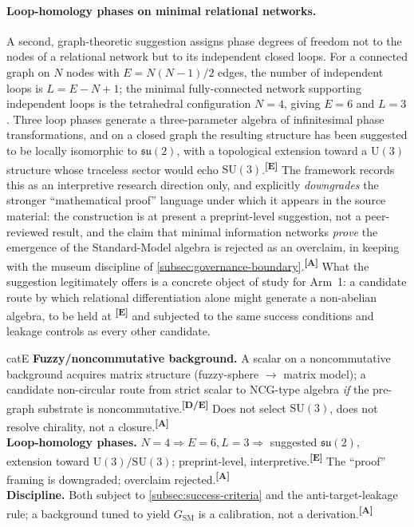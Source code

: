 \documentclass[12pt,a4paper,twoside]{article}
\theoremstyle{plain}
\theoremstyle{definition}
\theoremstyle{remark}
\newcommand{\catmark}[1]{\textsuperscript{\textsf{\textbf{[#1]}}}}
\begin{document}
\paragraph{Loop-homology phases on minimal relational networks.}
A second, graph-theoretic suggestion assigns phase degrees of freedom not to the nodes of a relational network but to its independent closed loops. For a connected graph on $N$ nodes with $E = N(N-1)/2$ edges, the number of independent loops is $L = E - N + 1$; the minimal fully-connected network supporting independent loops is the tetrahedral configuration $N=4$, giving $E=6$ and $L=3$. Three loop phases generate a three-parameter algebra of infinitesimal phase transformations, and on a closed graph the resulting structure has been suggested to be locally isomorphic to $\mathfrak{su}(2)$, with a topological extension toward a $\mathrm{U}(3)$ structure whose traceless sector would echo $\mathrm{SU}(3)$.\catmark{E} The framework records this as an interpretive research direction only, and explicitly \emph{downgrades} the stronger ``mathematical proof'' language under which it appears in the source material: the construction is at present a preprint-level suggestion, not a peer-reviewed result, and the claim that minimal information networks \emph{prove} the emergence of the Standard-Model algebra is rejected as an overclaim, in keeping with the museum discipline of \cref{subsec:governance-boundary}.\catmark{A} What the suggestion legitimately offers is a concrete object of study for Arm~1: a candidate route by which relational differentiation alone might generate a non-abelian algebra, to be held at \catmark{E} and subjected to the same success conditions and leakage controls as every other candidate.

\begin{evidencebox}{catE}
\textbf{Fuzzy/noncommutative background.} A scalar on a noncommutative background acquires matrix structure (fuzzy-sphere $\to$ matrix model); a candidate non-circular route from strict scalar to NCG-type algebra \emph{if} the pre-graph substrate is noncommutative.\catmark{D/E} Does not select $\mathrm{SU}(3)$, does
not resolve chirality, not a closure.\catmark{A}\\[0.3em]
\textbf{Loop-homology phases.} $N=4 \Rightarrow E=6, L=3 \Rightarrow$ suggested $\mathfrak{su}(2)$, extension toward $\mathrm{U}(3)/\mathrm{SU}(3)$; preprint-level, interpretive.\catmark{E} The ``proof'' framing is downgraded; overclaim
rejected.\catmark{A}\\[0.3em]
\textbf{Discipline.} Both subject to \cref{subsec:success-criteria} and the anti-target-leakage rule; a background tuned to yield $G_{\mathrm{SM}}$ is a calibration, not a derivation.\catmark{A}
\end{evidencebox}
\end{document}
